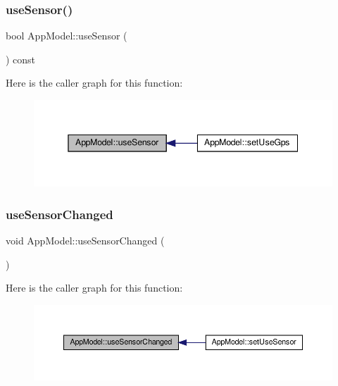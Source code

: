\subsubsection{\texorpdfstring{use\+Sensor()}{useSensor()}}
{\footnotesize\ttfamily bool App\+Model\+::use\+Sensor (\begin{DoxyParamCaption}{ }\end{DoxyParamCaption}) const}

Here is the caller graph for this function\+:
\nopagebreak
\begin{figure}[H]
\begin{center}
\leavevmode
\includegraphics[width=345pt]{class_app_model_a5b83f8c93976273d6e9f1664e62efe63_icgraph}
\end{center}
\end{figure}
\mbox{\label{class_app_model_a947db57e8c272bdb2420f3f273cd2e6a}} 
\subsubsection{\texorpdfstring{use\+Sensor\+Changed}{useSensorChanged}}
{\footnotesize\ttfamily void App\+Model\+::use\+Sensor\+Changed (\begin{DoxyParamCaption}{ }\end{DoxyParamCaption})\hspace{0.3cm}{\ttfamily [signal]}}

Here is the caller graph for this function\+:
\nopagebreak
\begin{figure}[H]
\begin{center}
\leavevmode
\includegraphics[width=350pt]{class_app_model_a947db57e8c272bdb2420f3f273cd2e6a_icgraph}
\end{center}
\end{figure}
\mbox{\label{class_app_model_a70a5bec8e359e4edbd16611efa96cf32}} 
